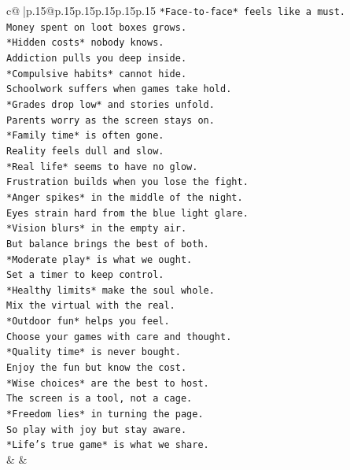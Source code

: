 \documentclass{article}
\begin{document}
{\begin{supertabular}{c@{$\;$}|p{.15\linewidth}@{}p{.15\linewidth}p{.15\linewidth}p{.15\linewidth}p{.15\linewidth}p{.15\linewidth}}
{{{\texttt{*Face{-}to{-}face* feels like a must.} \\
\texttt{Money spent on loot boxes grows.} \\
\texttt{*Hidden costs* nobody knows.} \\
\texttt{Addiction pulls you deep inside.} \\
\texttt{*Compulsive habits* cannot hide.} \\
\texttt{Schoolwork suffers when games take hold.} \\
\texttt{*Grades drop low* and stories unfold.} \\
\texttt{Parents worry as the screen stays on.} \\
\texttt{*Family time* is often gone.} \\
\texttt{Reality feels dull and slow.} \\
\texttt{*Real life* seems to have no glow.} \\
\texttt{Frustration builds when you lose the fight.} \\
\texttt{*Anger spikes* in the middle of the night.} \\
\texttt{Eyes strain hard from the blue light glare.} \\
\texttt{*Vision blurs* in the empty air.} \\
\texttt{But balance brings the best of both.} \\
\texttt{*Moderate play* is what we ought.} \\
\texttt{Set a timer to keep control.} \\
\texttt{*Healthy limits* make the soul whole.} \\
\texttt{Mix the virtual with the real.} \\
\texttt{*Outdoor fun* helps you feel.} \\
\texttt{Choose your games with care and thought.} \\
\texttt{*Quality time* is never bought.} \\
\texttt{Enjoy the fun but know the cost.} \\
\texttt{*Wise choices* are the best to host.} \\
\texttt{The screen is a tool, not a cage.} \\
\texttt{*Freedom lies* in turning the page.} \\
\texttt{So play with joy but stay aware.} \\
\texttt{*Life's true game* is what we share.} \\
            }
        }
    }
    & & \\ \\


\end{supertabular}}
\end{document}
